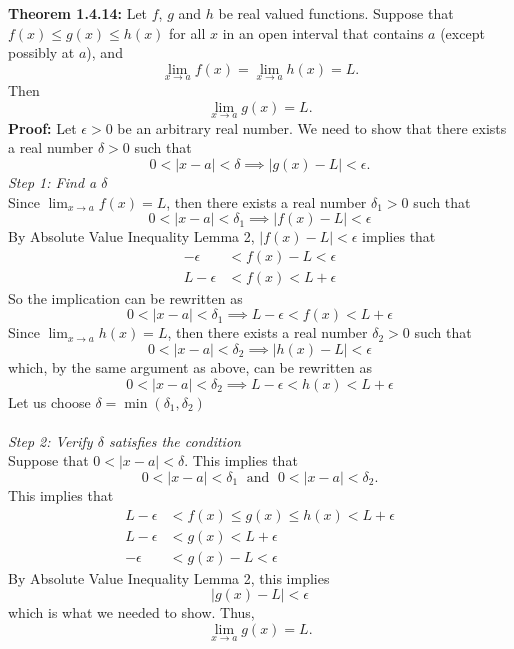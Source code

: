 \documentclass{article}
\begin{document}
	\textbf{Theorem 1.4.14:} Let $f$, $g$ and $h$ be real valued functions. Suppose that $f(x) \leq g(x) \leq h(x)$ for all $x$ in an open interval that contains $a$ (except possibly at $a$), and
	$$\lim_{x \to a}{f(x)} = \lim_{x \to a}{h(x)} = L.$$
	Then
	$$\lim_{x \to a}{g(x)} = L.$$
	\textbf{Proof:}
	Let $\epsilon > 0$ be an arbitrary real number. We need to show that there exists a real number $\delta > 0$ such that
	$$0 < |x - a| < \delta \implies |g(x) - L| < \epsilon.$$
	\textit{Step 1: Find a $\delta$} \\
	Since $\lim_{x \to a}{f(x)} = L$, then there exists a real number $\delta_1 > 0$ such that
	$$0 < |x - a| < \delta_1 \implies |f(x) - L| < \epsilon$$
	By Absolute Value Inequality Lemma 2, $|f(x) - L| < \epsilon$ implies that
	\begin{align*}
		-\epsilon &< f(x) - L < \epsilon \\
		L -\epsilon &< f(x) < L + \epsilon
	\end{align*}
	So the implication can be rewritten as
	$$0 < |x - a| < \delta_1 \implies L -\epsilon < f(x) < L + \epsilon$$
	Since $\lim_{x \to a}{h(x)} = L$, then there exists a real number $\delta_2 > 0$ such that
	$$0 < |x - a| < \delta_2 \implies |h(x) - L| < \epsilon$$
	which, by the same argument as above, can be rewritten as
	$$0 < |x - a| < \delta_2 \implies L -\epsilon < h(x) < L + \epsilon$$
	Let us choose $\delta = \min{(\delta_1, \delta_2)}$ \\\\
	\textit{Step 2: Verify $\delta$ satisfies the condition} \\
	Suppose that $0 < |x - a| < \delta$. This implies that
	$$0 < |x - a| < \delta_1 \; \text{ and } \; 0 < |x - a| < \delta_2.$$
	This implies that
	\begin{align*}
		L -\epsilon &< f(x) \leq g(x) \leq h(x) < L + \epsilon \\
		L -\epsilon &< g(x) < L + \epsilon \\
		-\epsilon &< g(x) - L < \epsilon
	\end{align*}
	By Absolute Value Inequality Lemma 2, this implies
	$$|g(x) - L| < \epsilon$$
	which is what we needed to show. Thus,
	$$\lim_{x \to a}{g(x)} = L.$$
\end{document}
